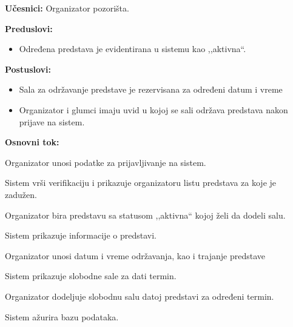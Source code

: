\documentclass[a4paper]{article}
\begin{document}
\noindent\textbf{Učesnici:} Organizator pozorišta.

\noindent\textbf{Preduslovi:}
  \begin{itemize}
    \item Određena predstava je evidentirana u sistemu kao ,,aktivna``.
  \end{itemize}

\noindent\textbf{Postuslovi:} 
  \begin{itemize}
    \item Sala za održavanje predstave je rezervisana za određeni datum i vreme
    \item Organizator i glumci imaju uvid u kojoj se sali održava predstava nakon prijave na sistem.
  \end{itemize}

\noindent\textbf{Osnovni tok:}
  \begin{legal}
 \item Organizator unosi podatke za prijavljivanje na sistem.
    \item Sistem vrši verifikaciju i prikazuje organizatoru listu predstava za koje je zadužen.
    \item Organizator bira predstavu sa statusom ,,aktivna`` kojoj želi da dodeli salu.
    \item Sistem prikazuje informacije o predstavi.
    \item Organizator unosi datum i vreme održavanja, kao i trajanje predstave
    \item Sistem prikazuje slobodne sale za dati termin.
    \item Organizator dodeljuje slobodnu salu datoj predstavi za određeni termin.
    \item Sistem ažurira bazu podataka.
  \end{legal}
\end{document}
